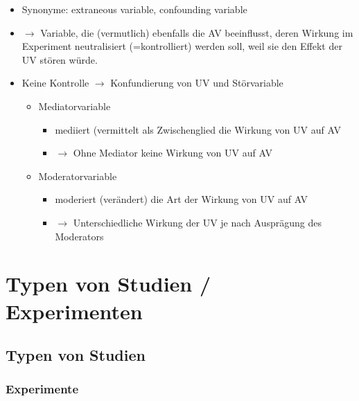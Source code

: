 \documentclass[
]{book}
\providecommand{\tightlist}{%
  \setlength{\itemsep}{0pt}\setlength{\parskip}{0pt}}
\begin{document}
\begin{itemize}
\tightlist
\item
  Synonyme: extraneous variable, confounding variable
\item
  \(\rightarrow\) Variable, die (vermutlich) ebenfalls die AV beeinflusst, deren Wirkung im Experiment neutralisiert (=kontrolliert) werden soll, weil sie den Effekt der UV stören würde.
\item
  Keine Kontrolle \(\rightarrow\) Konfundierung von UV und Störvariable

  \begin{itemize}
  \tightlist
  \item
    Mediatorvariable

    \begin{itemize}
    \tightlist
    \item
      mediiert (vermittelt als Zwischenglied die Wirkung von UV auf AV
    \item
      \(\rightarrow\) Ohne Mediator keine Wirkung von UV auf AV
    \end{itemize}
  \item
    Moderatorvariable

    \begin{itemize}
    \tightlist
    \item
      moderiert (verändert) die Art der Wirkung von UV auf AV
    \item
      \(\rightarrow\) Unterschiedliche Wirkung der UV je nach Ausprägung des Moderators
    \end{itemize}
  \end{itemize}
\end{itemize}

\hypertarget{typen-von-studien-experimenten}{%
\section{Typen von Studien / Experimenten}\label{typen-von-studien-experimenten}}

\hypertarget{typen-von-studien}{%
\subsection{Typen von Studien}\label{typen-von-studien}}

\hypertarget{experimente}{%
\subsubsection{Experimente}\label{experimente}}
\end{document}
